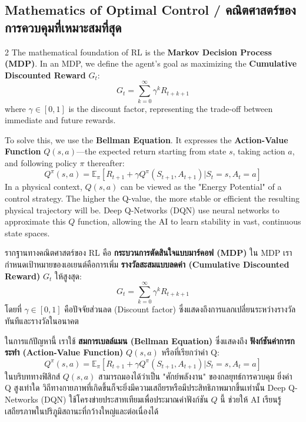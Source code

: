 \subsection{Mathematics of Optimal Control \quad / \quad \textthai{คณิตศาสตร์ของการควบคุมที่เหมาะสมที่สุด}}
\begin{paracol}{2}
The mathematical foundation of RL is the \textbf{Markov Decision Process (MDP)}. In an MDP, we define the agent's goal as maximizing the \textbf{Cumulative Discounted Reward} $G_t$:
\begin{equation}
    G_t = \sum_{k=0}^{\infty} \gamma^k R_{t+k+1}
\end{equation}
where $\gamma \in [0, 1]$ is the discount factor, representing the trade-off between immediate and future rewards.

To solve this, we use the \textbf{Bellman Equation}. It expresses the \textbf{Action-Value Function} $Q(s, a)$—the expected return starting from state $s$, taking action $a$, and following policy $\pi$ thereafter:
\begin{equation}
    Q^{\pi}(s, a) = \mathbb{E}_{\pi} [R_{t+1} + \gamma Q^{\pi}(S_{t+1}, A_{t+1}) | S_t=s, A_t=a]
\end{equation}
In a physical context, $Q(s, a)$ can be viewed as the "Energy Potential" of a control strategy. The higher the Q-value, the more stable or efficient the resulting physical trajectory will be. Deep Q-Networks (DQN) use neural networks to approximate this $Q$ function, allowing the AI to learn stability in vast, continuous state spaces.

\switchcolumn

\begin{thai}
รากฐานทางคณิตศาสตร์ของ RL คือ \textbf{กระบวนการตัดสินใจแบบมาร์คอฟ (MDP)} ใน MDP เรากำหนดเป้าหมายของเอเยนต์คือการเพิ่ม \textbf{รางวัลสะสมแบบลดค่า (Cumulative Discounted Reward)} $G_t$ ให้สูงสุด:
\begin{equation}
    G_t = \sum_{k=0}^{\infty} \gamma^k R_{t+k+1}
\end{equation}
โดยที่ $\gamma \in [0, 1]$ คือปัจจัยส่วนลด (Discount factor) ซึ่งแสดงถึงการแลกเปลี่ยนระหว่างรางวัลทันทีและรางวัลในอนาคต

ในการแก้ปัญหานี้ เราใช้ \textbf{สมการเบลล์แมน (Bellman Equation)} ซึ่งแสดงถึง \textbf{ฟังก์ชันค่าการกระทำ (Action-Value Function)} $Q(s, a)$ หรือที่เรียกว่าค่า Q:
\begin{equation}
    Q^{\pi}(s, a) = \mathbb{E}_{\pi} [R_{t+1} + \gamma Q^{\pi}(S_{t+1}, A_{t+1}) | S_t=s, A_t=a]
\end{equation}
ในบริบททางฟิสิกส์ $Q(s, a)$ สามารถมองได้ว่าเป็น "ศักย์พลังงาน" ของกลยุทธ์การควบคุม ยิ่งค่า Q สูงเท่าใด วิถีทางกายภาพที่เกิดขึ้นก็จะยิ่งมีความเสถียรหรือมีประสิทธิภาพมากขึ้นเท่านั้น Deep Q-Networks (DQN) ใช้โครงข่ายประสาทเทียมเพื่อประมาณค่าฟังก์ชัน $Q$ นี้ ช่วยให้ AI เรียนรู้เสถียรภาพในปริภูมิสถานะที่กว้างใหญ่และต่อเนื่องได้
\end{thai}
\end{paracol}
